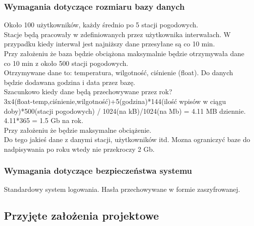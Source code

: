 \documentclass{article}
\begin{document}
    \subsubsection{Wymagania dotyczące rozmiaru bazy danych}
    Około 100 użytkowników, każdy średnio po 5 stacji pogodowych.\\
    Stacje będą pracowały w zdefiniowanych przez użytkownika interwałach. W przypadku kiedy interwał jest najniższy dane przesyłane są co 10 min.\\
    Przy założeniu że baza będzie obciążona maksymalnie będzie otrzymywała dane co 10 min z około 500 stacji pogodowych.\\
    Otrzymywane dane to: temperatura, wilgotność, ciśnienie (float). Do danych będzie dodawana godzina i data przez bazę.\\
    Szacunkowo kiedy dane będą przechowywane przez rok? \\
    3x4(float-temp,ciśnienie,wilgotność)+5(godzina)*144(ilość wpisów w ciągu doby)*500(stacji pogodowych) / 1024(na kB)/1024(na Mb) = 4.11 MB dziennie.\\
    4.11*365 = 1.5 Gb na rok.\\
    Przy założeniu że będzie maksymalne obciążenie.\\
    Do tego jakieś dane z danymi stacji, użytkowników itd.
    Mozna ograniczyć baze do nadpisywania po roku wtedy nie przekroczy 2 Gb.
    
\subsubsection{Wymagania dotyczące bezpieczeństwa systemu}
    Standardowy system logowania. Hasła przechowywane w formie zaszyfrowanej.
\subsection{Przyjęte założenia projektowe}



% 
% 
\end{document}
